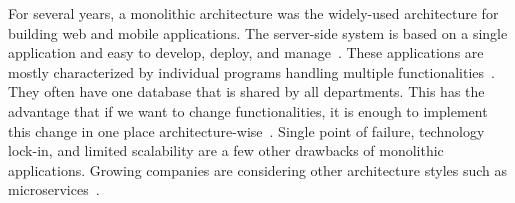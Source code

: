 \par For several years, a monolithic architecture was the widely-used architecture for building web and mobile applications. The server-side system is based on a single application and easy to develop, deploy, and manage~\cite{Danbettinger2019}. These applications are mostly characterized by individual programs handling multiple functionalities~\cite{Francesco2019}. They often have one database that is shared by all departments. This has the advantage that if we want to change functionalities, it is enough to implement this change in one place architecture-wise~\cite{Pavlovic2020monolith}. 
Single point of failure, technology lock-in, and limited scalability are a few other drawbacks of monolithic applications. Growing companies are considering other architecture styles such as microservices~\cite{Lenga2019, Jag2017, Rodrigue2016}. 




